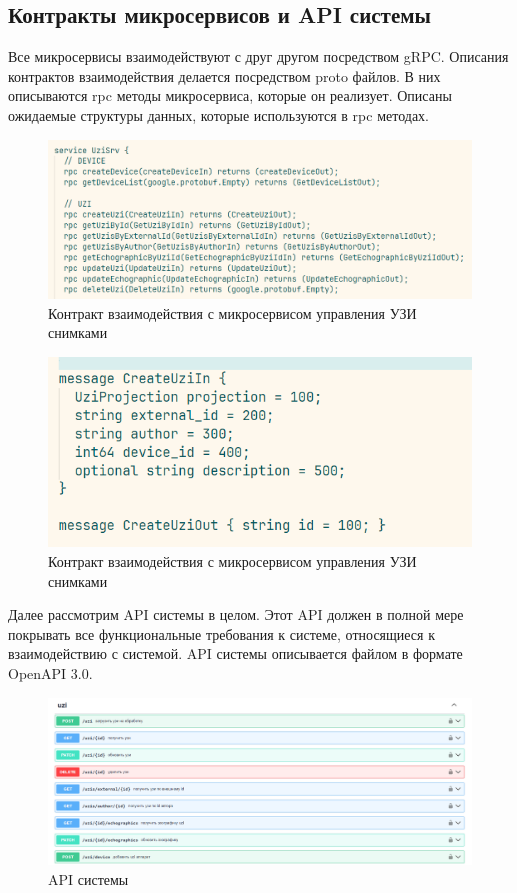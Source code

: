 \subsection{Контракты микросервисов и API системы}
Все микросервисы взаимодействуют с друг другом посредством gRPC. Описания контрактов взаимодействия делается посредством
proto файлов. В них описываются rpc методы микросервиса, которые он реализует. Описаны ожидаемые структуры данных, которые 
используются в rpc методах.

\begin{figure}[H]%
	\begin{center}
		\includegraphics[width=.7\columnwidth]{./img/new/rpc_proto_1.png}%
	\end{center}
	\caption{Контракт взаимодействия с микросервисом управления УЗИ снимками}%
	\label{pic:rpc_proto_1}%
\end{figure}

\begin{figure}[H]%
	\begin{center}
		\includegraphics[width=.7\columnwidth]{./img/new/rpc_proto_2.png}%
	\end{center}
	\caption{Контракт взаимодействия с микросервисом управления УЗИ снимками}%
	\label{pic:rpc_proto_2}%
\end{figure}

Далее рассмотрим API системы в целом. Этот API должен в полной мере покрывать все функциональные требования к системе, 
относящиеся к взаимодействию с системой. API системы описывается файлом в формате OpenAPI 3.0.

\begin{figure}[H]%
	\begin{center}
		\includegraphics[width=.7\columnwidth]{./img/new/swagger_small.png}%
	\end{center}
	\caption{API системы}%
	\label{pic:swagger_small}%
\end{figure}

